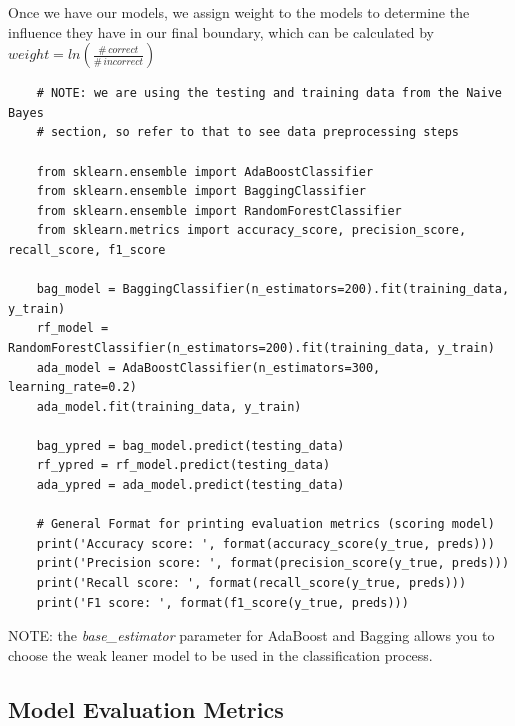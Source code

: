\documentclass[11pt, a4paper]{article}
\begin{document}
\begin{spacing}{1.1}
	Once we have our models, we assign weight to the models to determine the influence they have in our final boundary, which can be calculated by $weight = ln(\frac{\#\, correct}{\#\, incorrect})$
	\begin{lstlisting}
	# NOTE: we are using the testing and training data from the Naive Bayes
	# section, so refer to that to see data preprocessing steps
	
	from sklearn.ensemble import AdaBoostClassifier
	from sklearn.ensemble import BaggingClassifier
	from sklearn.ensemble import RandomForestClassifier
	from sklearn.metrics import accuracy_score, precision_score, recall_score, f1_score
	
	bag_model = BaggingClassifier(n_estimators=200).fit(training_data, y_train)
	rf_model = RandomForestClassifier(n_estimators=200).fit(training_data, y_train)
	ada_model = AdaBoostClassifier(n_estimators=300, learning_rate=0.2)
	ada_model.fit(training_data, y_train)
	
	bag_ypred = bag_model.predict(testing_data)
	rf_ypred = rf_model.predict(testing_data)
	ada_ypred = ada_model.predict(testing_data)
	
	# General Format for printing evaluation metrics (scoring model)
	print('Accuracy score: ', format(accuracy_score(y_true, preds)))
	print('Precision score: ', format(precision_score(y_true, preds)))
	print('Recall score: ', format(recall_score(y_true, preds)))
	print('F1 score: ', format(f1_score(y_true, preds)))	
	\end{lstlisting} \vspace*{3mm}
	NOTE: the \textit{base\_estimator} parameter for AdaBoost and Bagging allows you to choose the weak leaner model to be used in the classification process.	\newpage

	\subsection{Model Evaluation Metrics}

\end{spacing}
\end{document}
